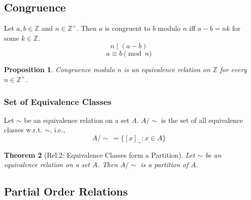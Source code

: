 \documentclass{article}
\theoremstyle{plain}
\newtheorem{theorem}{Theorem}[section]
\newtheorem{proposition}[theorem]{Proposition}
\theoremstyle{definition}
\theoremstyle{remark}
\begin{document}
\vspace{1em}
\begin{center}
\end{center}
\vspace{1em}

\subsection{Congruence}
Let $a, b \in \mathbb{Z}$ and $n \in \mathbb{Z}^+$. Then $a$ is congruent to $b$ modulo $n$ iff $a - b = nk$ for some $k \in \mathbb{Z}$.
\[ n \mid (a - b) \]
\[ a \equiv b \pmod{n} \]

\begin{proposition}
    Congruence modulo $n$ is an equivalence relation on $\mathbb{Z}$ for every $n \in \mathbb{Z}^+$.
\end{proposition}

\subsubsection{Set of Equivalence Classes}
Let $\sim$ be an equivalence relation on a set $A$. $A/\sim$ is the set of all equivalence classes w.r.t. $\sim$, i.e.,
\[ A/\sim \ = \{[x]_\sim : x \in A\} \]

\begin{theorem}[Rel.2: Equivalence Classes form a Partition]
    Let $\sim$ be an equivalence relation on a set $A$. Then $A/\sim$ is a partition of $A$.
\end{theorem}

\subsection{Partial Order Relations}
\end{document}

